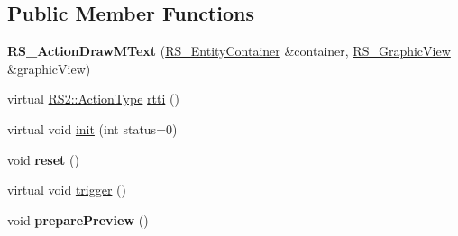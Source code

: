 \subsection*{Public Member Functions}
\begin{DoxyCompactItemize}
\item 
\hypertarget{classRS__ActionDrawMText_a96b22c4e90c91158e6485726c54396e0}{{\bfseries R\-S\-\_\-\-Action\-Draw\-M\-Text} (\hyperlink{classRS__EntityContainer}{R\-S\-\_\-\-Entity\-Container} \&container, \hyperlink{classRS__GraphicView}{R\-S\-\_\-\-Graphic\-View} \&graphic\-View)}\label{classRS__ActionDrawMText_a96b22c4e90c91158e6485726c54396e0}

\item 
virtual \hyperlink{classRS2_afe3523e0bc41fd637b892321cfc4b9d7}{R\-S2\-::\-Action\-Type} \hyperlink{classRS__ActionDrawMText_aa8070f87336faac9b81a2d32dcaf851c}{rtti} ()
\item 
virtual void \hyperlink{classRS__ActionDrawMText_abaa6ec90e1af2e8a12e02ca9ab3e2dec}{init} (int status=0)
\item 
\hypertarget{classRS__ActionDrawMText_a24678fc143529cdac4a64881aaacdc5d}{void {\bfseries reset} ()}\label{classRS__ActionDrawMText_a24678fc143529cdac4a64881aaacdc5d}

\item 
virtual void \hyperlink{classRS__ActionDrawMText_a45cebf26719a492b2816aeec1d4f6f65}{trigger} ()
\item 
\hypertarget{classRS__ActionDrawMText_a15fc1aca3fc66eec49de48673e268b7e}{void {\bfseries prepare\-Preview} ()}\label{classRS__ActionDrawMText_a15fc1aca3fc66eec49de48673e268b7e}


\end{DoxyCompactItemize}
